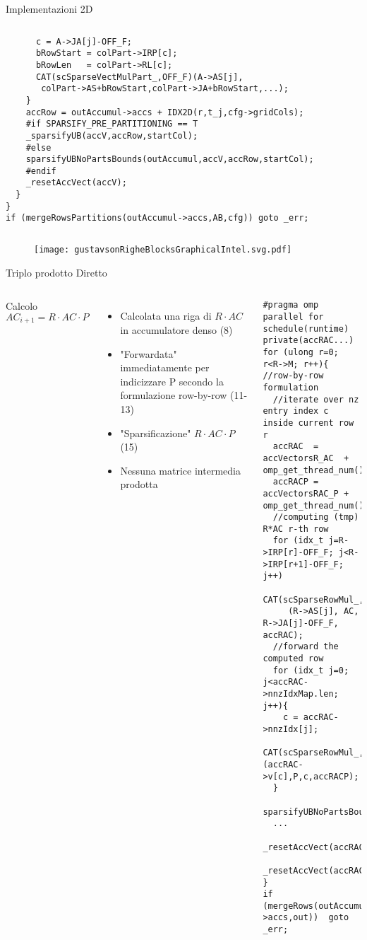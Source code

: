 \begin{frame}[fragile]  {Implementazioni 2D}
\begin{columns}
\begin{lstlisting}
      c = A->JA[j]-OFF_F;
      bRowStart = colPart->IRP[c];
      bRowLen   = colPart->RL[c];
      CAT(scSparseVectMulPart_,OFF_F)(A->AS[j],
       colPart->AS+bRowStart,colPart->JA+bRowStart,...);
    }
    accRow = outAccumul->accs + IDX2D(r,t_j,cfg->gridCols);
    #if SPARSIFY_PRE_PARTITIONING == T
    _sparsifyUB(accV,accRow,startCol);
    #else
    sparsifyUBNoPartsBounds(outAccumul,accV,accRow,startCol);
    #endif
    _resetAccVect(accV);
  }
}
if (mergeRowsPartitions(outAccumul->accs,AB,cfg)) goto _err;
	\end{lstlisting}
\end{columns}
	\begin{figure}[H]
  	\centering
	\texttt{[image: gustavsonRigheBlocksGraphicalIntel.svg.pdf]}
	\end{figure}
\end{frame}

\begin{frame}[fragile]  {Triplo prodotto Diretto}
\begin{columns}
	Calcolo $AC_{i+1} = R \cdot AC \cdot P$
	\begin{itemize}
		\item	Calcolata una riga di $R \cdot AC$\\
		in accumulatore denso (8)
		\item	"Forwardata" immediatamente per indicizzare P
		secondo la formulazione row-by-row (11-13)
		\item	"Sparsificazione" $R\cdot AC\cdot P$ (15)
		\item	Nessuna matrice intermedia prodotta
	\end{itemize}
	\begin{lstlisting}
#pragma omp parallel for schedule(runtime) private(accRAC...)
for (ulong r=0;  r<R->M; r++){  //row-by-row formulation
  //iterate over nz entry index c inside current row r
  accRAC  = accVectorsR_AC  + omp_get_thread_num();
  accRACP = accVectorsRAC_P + omp_get_thread_num();
  //computing (tmp) R*AC r-th row
  for (idx_t j=R->IRP[r]-OFF_F; j<R->IRP[r+1]-OFF_F; j++)
    CAT(scSparseRowMul_,OFF_F)
     (R->AS[j], AC, R->JA[j]-OFF_F, accRAC);
  //forward the computed row
  for (idx_t j=0; j<accRAC->nnzIdxMap.len; j++){
    c = accRAC->nnzIdx[j];  
    CAT(scSparseRowMul_,OFF_F)(accRAC->v[c],P,c,accRACP);
  }
  sparsifyUBNoPartsBounds(outAccumul,accRACP,...);
  ...
  _resetAccVect(accRAC);
  _resetAccVect(accRACP);
}
if (mergeRows(outAccumul->accs,out))  goto _err;
	\end{lstlisting}
\end{columns}
\end{frame}

